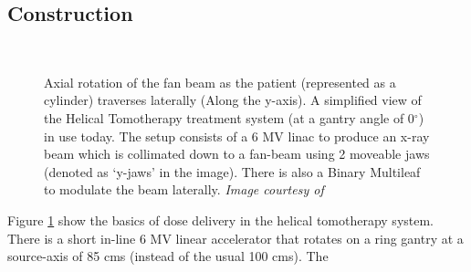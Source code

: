 \documentclass[10pt,journal,compsoc]{IEEEtran} %
\begin{document}
  \subsection{Construction}
  \label{construction}
  \begin{figure}
    \centering
    \\
    \caption{\protect{} Axial rotation of the fan beam as the 
      patient (represented 
      as a cylinder) traverses laterally (Along the y-axis). 
      \protect{} A simplified view of the Helical 
      Tomotherapy 
      treatment system (at a gantry angle of 0$^\circ$) in use today. The 
      setup consists of a 6 MV linac to produce an x-ray beam which is 
      collimated down to a fan-beam using 2 moveable jaws (denoted as `y-jaws' 
      in the image). There is also a Binary Multileaf to modulate the beam 
      laterally. \textit{Image  
      courtesy of \cite{Fenwick2004}}}
    \label{fig4}
  \end{figure}
  Figure \ref{fig4} show the basics of dose delivery in the helical tomotherapy 
  system. There is a short in-line 6 MV linear accelerator that rotates on a 
  ring gantry at a source-axis of 85 cms (instead of the usual 100 cms). The 
\end{document}

